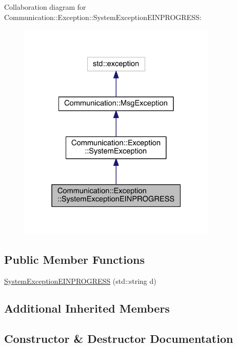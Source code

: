 Collaboration diagram for Communication\+:\+:Exception\+:\+:System\+Exception\+E\+I\+N\+P\+R\+O\+G\+R\+E\+S\+S\+:\nopagebreak
\begin{figure}[H]
\begin{center}
\leavevmode
\includegraphics[width=268pt]{class_communication_1_1_exception_1_1_system_exception_e_i_n_p_r_o_g_r_e_s_s__coll__graph}
\end{center}
\end{figure}
\subsection*{Public Member Functions}
\begin{DoxyCompactItemize}
\item 
\hyperlink{class_communication_1_1_exception_1_1_system_exception_e_i_n_p_r_o_g_r_e_s_s_ae423f4928ef5b9a353f7f53e7a9b344f}{System\+Exception\+E\+I\+N\+P\+R\+O\+G\+R\+E\+S\+S} (std\+::string d)
\end{DoxyCompactItemize}
\subsection*{Additional Inherited Members}


\subsection{Constructor \& Destructor Documentation}
\hypertarget{class_communication_1_1_exception_1_1_system_exception_e_i_n_p_r_o_g_r_e_s_s_ae423f4928ef5b9a353f7f53e7a9b344f}{}
